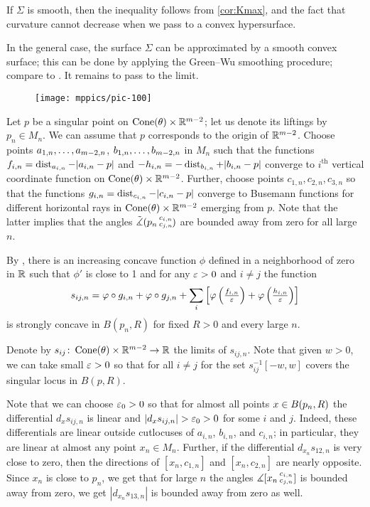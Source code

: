  If $\Sigma$ is smooth, then the inequality follows from \ref{cor:Kmax}, and the fact that curvature cannot decrease when we pass to a convex hypersurface.

In the general case, the surface $\Sigma$ can be approximated by a smooth convex surface;
this can be done by applying the Green--Wu smoothing procedure; compare to \cite{AKP-buyalo}.
It remains to pass to the limit.
\qeds

\begin{wrapfigure}{r}{35 mm}
\vskip-0mm
\centering
\texttt{[image: mppics/pic-100]}
\vskip0mm
\end{wrapfigure}

Let $p$ be a singular point on $\operatorname{Cone}(\theta)\times \mathbb{R}^{m-2}$;
let us denote its liftings by $p_n\in M_n$.
We can assume that $p$ corresponds to the origin of $\mathbb{R}^{m-2}$.
Choose points $a_{1,n},\zz\dots,a_{m-2,n}$, $b_{1,n},\zz\dots,b_{m-2,n}$ in $M_n$ such that the functions $f_{i,n}\zz=\dist_{a_{i,n}}\zz-|a_{i,n}-p|$ and $-h_{i,n}\zz=-\dist_{b_{i,n}}+|b_{i,n}-p|$ converge to $i^{\text{th}}$ vertical coordinate function on $\Cone(\theta)\zz\times \RR^{m-2}$.
Further, choose points $c_{1,n},c_{2,n},c_{3,n}$ so that the functions $g_{i,n}\zz=\dist_{c_{i,n}}-|c_{i,n}-p|$ converge to Busemann functions for different horizontal rays in $\operatorname{Cone}(\theta)\times \mathbb{R}^{m-2}$ emerging from $p$.
Note that the latter implies that the angles $\tilde\measuredangle(p_n\,{}^{c_{i,n}}_{c_{j,n}}\hspace{-0.2ex})$ are bounded away from zero for all large~$n$.

By \cite[Lemma 7.2.1]{petrunin-conc}, there is an increasing concave function $\phi$ defined in a neighborhood of zero in $\mathbb{R}$ such that $\phi'$ is close to 1 and for any $\varepsilon>0$ and $i\ne j$ the function 
\[s_{ij,n}
=
\varphi\circ g_{i,n}
+
\varphi\circ g_{j,n}
+
\sum_i\left[\varphi\left(\tfrac{f_{i,n}}{\varepsilon}\right)+\varphi\left(\tfrac{h_{i,n}}{\varepsilon}\right)\right]\]
is strongly concave in $B(p_n,R)$ for fixed $R>0$ and every large $n$.

Denote by $s_{ij}\:\Cone(\theta)\zz\times \RR^{m-2}\zz\to \RR$ the limits of $s_{ij,n}$.
Note that given $w>0$, we can take small $\varepsilon>0$ so that for all $i\ne j$ for the set $s_{ij}^{-1}[-w,w]$ covers the singular locus in $B(p,R)$. 

Note that we can choose $\varepsilon_0>0$ so that for almost all points $x\zz\in B(p_n,R)$ 
the differential $d_xs_{ij,n}$ is linear and $|d_xs_{ij,n}|>\eps_0>0$ for some $i$ and $j$.
Indeed, these differentials are linear outside cutlocuses of $a_{i,n}$, $b_{i,n}$, and $c_{i,n}$;
in particular, they are linear at almost any point $x_n\in M_n$.
Further, if the differential $d_{x_n}s_{12,n}$ is very close to zero,
then the directions of $[x_n,c_{1,n}]$ and $[x_n,c_{2,n}]$ are nearly opposite.
Since $x_n$ is close to $p_n$, we get that for large $n$ the angles $\measuredangle[x_n\,{}^{c_{i,n}}_{c_{j,n}}]$ is bounded away from zero, we get $|d_{x_n}s_{13,n}|$ is bounded away from zero as well.

